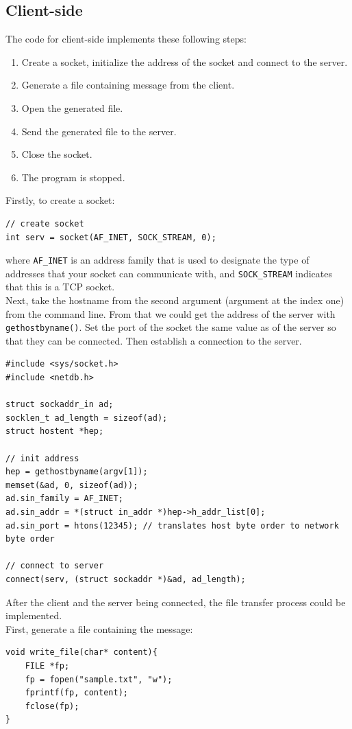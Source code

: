 \documentclass[times, 10pt]{thesisMDH}
\begin{document}
\subsection{Client-side}
The code for client-side implements these following steps:
\begin{enumerate}
    \item Create a socket, initialize the address of the socket and connect to the server.
    \item Generate a file containing message from the client.
    \item Open the generated file.
    \item Send the generated file to the server.
    \item Close the socket.
    \item The program is stopped.
\end{enumerate}
Firstly, to create a socket:
\begin{lstlisting}
// create socket
int serv = socket(AF_INET, SOCK_STREAM, 0);
\end{lstlisting}
where \texttt{AF\_INET} is an address family that is used to designate the type of addresses that your socket can communicate with, and \texttt{SOCK\_STREAM} indicates that this is a TCP socket.\\[0.5em]
Next, take the hostname from the second argument (argument at the index one) from the command line. From that we could get the address of the server with \texttt{gethostbyname()}. Set the port of the socket the same value as of the server so that they can be connected. Then establish a connection to the server.
\begin{lstlisting}
#include <sys/socket.h>
#include <netdb.h>

struct sockaddr_in ad;
socklen_t ad_length = sizeof(ad);
struct hostent *hep;

// init address
hep = gethostbyname(argv[1]);
memset(&ad, 0, sizeof(ad));
ad.sin_family = AF_INET;
ad.sin_addr = *(struct in_addr *)hep->h_addr_list[0];
ad.sin_port = htons(12345); // translates host byte order to network byte order 

// connect to server
connect(serv, (struct sockaddr *)&ad, ad_length);
\end{lstlisting}
After the client and the server being connected, the file transfer process could be implemented.\\[0.5em]
First, generate a file containing the message:
\begin{lstlisting}
void write_file(char* content){
	FILE *fp;
	fp = fopen("sample.txt", "w");
	fprintf(fp, content);
	fclose(fp);
}
\end{lstlisting}
\end{document}
